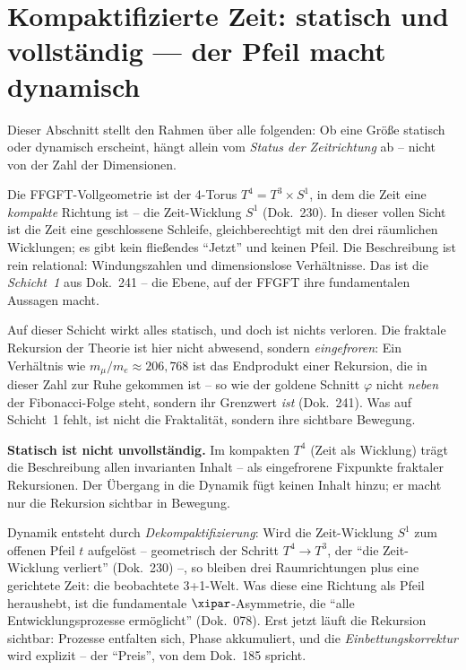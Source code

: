 \section{Kompaktifizierte Zeit: statisch und vollständig --- der Pfeil macht dynamisch}
\label{sec:rahmen}

Dieser Abschnitt stellt den Rahmen über alle folgenden: Ob eine Größe statisch
oder dynamisch erscheint, hängt allein vom \emph{Status der Zeitrichtung} ab --
nicht von der Zahl der Dimensionen.

Die FFGFT-Vollgeometrie ist der 4-Torus $T^4 = T^3 \times S^1$, in dem die Zeit
eine \emph{kompakte} Richtung ist -- die Zeit-Wicklung $S^1$ (Dok.~230). In dieser
vollen Sicht ist die Zeit eine geschlossene Schleife, gleichberechtigt mit den
drei räumlichen Wicklungen; es gibt kein fließendes ``Jetzt'' und keinen Pfeil.
Die Beschreibung ist rein relational: Windungszahlen und dimensionslose
Verhältnisse. Das ist die \emph{Schicht~1} aus Dok.~241 -- die Ebene, auf der
FFGFT ihre fundamentalen Aussagen macht.

Auf dieser Schicht wirkt alles statisch, und doch ist nichts verloren. Die
fraktale Rekursion der Theorie ist hier nicht abwesend, sondern \emph{eingefroren}:
Ein Verhältnis wie $m_\mu/m_e \approx 206{,}768$ ist das Endprodukt einer
Rekursion, die in dieser Zahl zur Ruhe gekommen ist -- so wie der goldene Schnitt
$\varphi$ nicht \emph{neben} der Fibonacci-Folge steht, sondern ihr Grenzwert
\emph{ist} (Dok.~241). Was auf Schicht~1 fehlt, ist nicht die Fraktalität, sondern
ihre sichtbare Bewegung.

\begin{prinzip}
\textbf{Statisch ist nicht unvollständig.} Im kompakten $T^4$ (Zeit als Wicklung)
trägt die Beschreibung allen invarianten Inhalt -- als eingefrorene Fixpunkte
fraktaler Rekursionen. Der Übergang in die Dynamik fügt keinen Inhalt hinzu; er
macht nur die Rekursion sichtbar in Bewegung.
\end{prinzip}

Dynamik entsteht durch \emph{Dekompaktifizierung}: Wird die Zeit-Wicklung $S^1$ zum
offenen Pfeil $t$ aufgelöst -- geometrisch der Schritt $T^4 \to T^3$, der ``die
Zeit-Wicklung verliert'' (Dok.~230) --, so bleiben drei Raumrichtungen plus eine
gerichtete Zeit: die beobachtete 3+1-Welt. Was diese eine Richtung als Pfeil
heraushebt, ist die fundamentale $\xipar$-Asymmetrie, die ``alle
Entwicklungsprozesse ermöglicht'' (Dok.~078). Erst jetzt läuft die Rekursion
sichtbar: Prozesse entfalten sich, Phase akkumuliert, und die
\emph{Einbettungskorrektur} wird explizit -- der ``Preis'', von dem Dok.~185
spricht.

